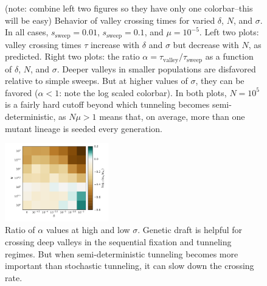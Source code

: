 \documentclass[rmp]{revtex4}
\begin{document}
\begin{figure}
\begin{subfigure}[b]{0.4\textwidth}
\end{subfigure}
\caption{(note: combine left two figures so they have only one colorbar--this will be easy) Behavior of valley crossing times for varied $\delta$, $N$, and $\sigma$. In all cases, $s_{\mathrm{sweep}} = 0.01$, $s_{\mathrm{sweep}} = 0.1$, and $\mu = 10^{-5}$. Left two plots: valley crossing times $\tau$ increase with $\delta$ and $\sigma$ but decrease with $N$, as predicted. Right two plots: the ratio $\alpha = \tau_{\mathrm{valley}}/\tau_{\mathrm{sweep}}$ as a function of $\delta$, $N$, and $\sigma$. Deeper valleys in smaller populations are disfavored relative to simple sweeps. But at higher values of $\sigma$, they can be favored ($\alpha < 1$: note the log scaled colorbar). In both plots, $N = 10^5$ is a fairly hard cutoff beyond which tunneling becomes semi-deterministic, as $N\mu > 1$ means that, on average, more than one mutant lineage is seeded every generation.}
\label{fig:ratios}
\end{figure}

\begin{figure}
\includegraphics[width=0.4\textwidth]{Figures/compare_ratios.pdf}
\caption{Ratio of $\alpha$ values at high and low $\sigma$. Genetic draft is helpful for crossing deep valleys in the sequential fixation and tunneling regimes. But when semi-deterministic tunneling becomes more important than stochastic tunneling, it can slow down the crossing rate.}
\label{fig:alpha_ratio}
\end{figure}
\end{document}
